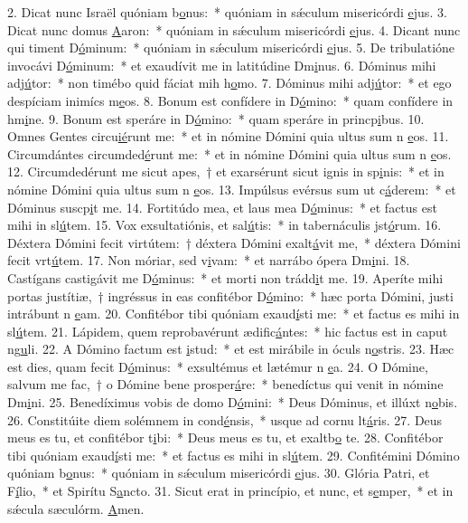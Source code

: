 2. Dicat nunc Israël quóniam b\uline{o}nus:~* quóniam in sǽculum misericórdi \uline{e}jus.
3. Dicat nunc domus \uline{A}aron:~* quóniam in sǽculum misericórdi \uline{e}jus.
4. Dicant nunc qui timent D\uline{ó}minum:~* quóniam in sǽculum misericórdi \uline{e}jus.
5. De tribulatióne invocávi D\uline{ó}minum:~* et exaudívit me in latitúdine Dm\uline{i}nus.
6. Dóminus mihi adj\uline{ú}tor:~* non timébo quid fáciat mih h\uline{o}mo.
7. Dóminus mihi adj\uline{ú}tor:~* et ego despíciam inimícs m\uline{e}os.
8. Bonum est confídere in D\uline{ó}mino:~* quam confídere in hm\uline{i}ne.
9. Bonum est speráre in D\uline{ó}mino:~* quam speráre in princp\uline{i}bus.
10. Omnes Gentes circu\uline{ié}runt me:~* et in nómine Dómini quia ultus sum n \uline{e}os.
11. Circumdántes circumded\uline{é}runt me:~* et in nómine Dómini quia ultus sum n \uline{e}os.
12. Circumdedérunt me sicut apes,~† et exarsérunt sicut ignis in sp\uline{i}nis:~* et in nómine Dómini quia ultus sum n \uline{e}os.
13. Impúlsus evérsus sum ut c\uline{á}derem:~* et Dóminus suscp\uline{i}t me.
14. Fortitúdo mea, et laus mea D\uline{ó}minus:~* et factus est mihi in sl\uline{ú}tem.
15. Vox exsultatiónis, et sal\uline{ú}tis:~* in tabernáculis jst\uline{ó}rum.
16. Déxtera Dómini fecit virtútem:~† déxtera Dómini exalt\uline{á}vit me,~* déxtera Dómini fecit vrt\uline{ú}tem.
17. Non móriar, sed v\uline{i}vam:~* et narrábo ópera Dm\uline{i}ni.
18. Castígans castigávit me D\uline{ó}minus:~* et morti non trádd\uline{i}t me.
19. Aperíte mihi portas justítiæ,~† ingréssus in eas confitébor D\uline{ó}mino:~* hæc porta Dómini, justi intrábunt n \uline{e}am.
20. Confitébor tibi quóniam exaud\uline{í}sti me:~* et factus es mihi in sl\uline{ú}tem.
21. Lápidem, quem reprobavérunt ædific\uline{á}ntes:~* hic factus est in caput ng\uline{u}li.
22. A Dómino factum est \uline{i}stud:~* et est mirábile in óculs n\uline{o}stris.
23. Hæc est dies, quam fecit D\uline{ó}minus:~* exsultémus et lætémur n \uline{e}a.
24. O Dómine, salvum me fac,~† o Dómine bene prosper\uline{á}re:~* benedíctus qui venit in nómine Dm\uline{i}ni.
25. Benedíximus vobis de domo D\uline{ó}mini:~* Deus Dóminus, et illúxt n\uline{o}bis.
26. Constitúite diem solémnem in cond\uline{é}nsis,~* usque ad cornu lt\uline{á}ris.
27. Deus meus es tu, et confitébor t\uline{i}bi:~* Deus meus es tu, et exaltb\uline{o} te.
28. Confitébor tibi quóniam exaud\uline{í}sti me:~* et factus es mihi in sl\uline{ú}tem.
29. Confitémini Dómino quóniam b\uline{o}nus:~* quóniam in sǽculum misericórdi \uline{e}jus.
30. Glória Patri, et F\uline{í}lio,~* et Spirítu S\uline{a}ncto.
31. Sicut erat in princípio, et nunc, et s\uline{e}mper,~* et in sǽcula sæculórm. \uline{A}men.
